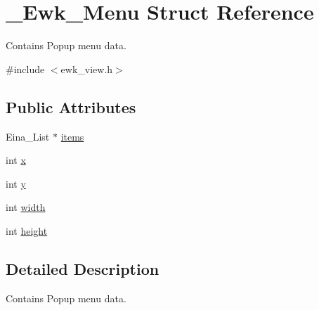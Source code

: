 \hypertarget{struct__Ewk__Menu}{\section{\+\_\+\+Ewk\+\_\+\+Menu Struct Reference}
\label{struct__Ewk__Menu}
}


Contains Popup menu data.  




{\ttfamily \#include $<$ewk\+\_\+view.\+h$>$}

\subsection*{Public Attributes}
\begin{DoxyCompactItemize}
\item 
Eina\+\_\+\+List $\ast$ \hyperlink{struct__Ewk__Menu_af8209eb62a25b2a9de02794deed521fb}{items}
\item 
int \hyperlink{struct__Ewk__Menu_aaef787698c24971081207c50f2377ca1}{x}
\item 
int \hyperlink{struct__Ewk__Menu_ab6a7efedc1706adc095607da63a416c6}{y}
\item 
int \hyperlink{struct__Ewk__Menu_ab728557f34eabfceaca659953b852523}{width}
\item 
int \hyperlink{struct__Ewk__Menu_ab820d3fd361f18580adf97aa6273ac70}{height}
\end{DoxyCompactItemize}


\subsection{Detailed Description}
Contains Popup menu data. 

